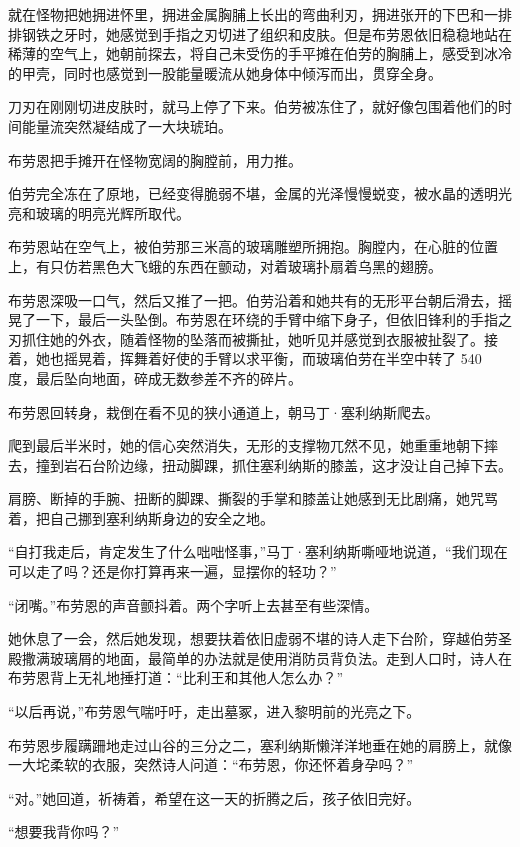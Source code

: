\documentclass[AutoFakeBold=true]{book}
\begin{document}
就在怪物把她拥进怀里，拥进金属胸脯上长出的弯曲利刃，拥进张开的下巴和一排排钢铁之牙时，她感觉到手指之刃切进了组织和皮肤。但是布劳恩依旧稳稳地站在稀薄的空气上，她朝前探去，将自己未受伤的手平摊在伯劳的胸脯上，感受到冰冷的甲壳，同时也感觉到一股能量暖流从她身体中倾泻而出，贯穿全身。

刀刃在刚刚切进皮肤时，就马上停了下来。伯劳被冻住了，就好像包围着他们的时间能量流突然凝结成了一大块琥珀。

布劳恩把手摊开在怪物宽阔的胸膛前，用力推。

伯劳完全冻在了原地，已经变得脆弱不堪，金属的光泽慢慢蜕变，被水晶的透明光亮和玻璃的明亮光辉所取代。

布劳恩站在空气上，被伯劳那三米高的玻璃雕塑所拥抱。胸膛内，在心脏的位置上，有只仿若黑色大飞蛾的东西在颤动，对着玻璃扑扇着乌黑的翅膀。

布劳恩深吸一口气，然后又推了一把。伯劳沿着和她共有的无形平台朝后滑去，摇晃了一下，最后一头坠倒。布劳恩在环绕的手臂中缩下身子，但依旧锋利的手指之刃抓住她的外衣，随着怪物的坠落而被撕扯，她听见并感觉到衣服被扯裂了。接着，她也摇晃着，挥舞着好使的手臂以求平衡，而玻璃伯劳在半空中转了 540 度，最后坠向地面，碎成无数参差不齐的碎片。

布劳恩回转身，栽倒在看不见的狭小通道上，朝马丁·塞利纳斯爬去。

爬到最后半米时，她的信心突然消失，无形的支撑物兀然不见，她重重地朝下摔去，撞到岩石台阶边缘，扭动脚踝，抓住塞利纳斯的膝盖，这才没让自己掉下去。

肩膀、断掉的手腕、扭断的脚踝、撕裂的手掌和膝盖让她感到无比剧痛，她咒骂着，把自己挪到塞利纳斯身边的安全之地。

``自打我走后，肯定发生了什么咄咄怪事，''马丁·塞利纳斯嘶哑地说道，``我们现在可以走了吗？还是你打算再来一遍，显摆你的轻功？''

``闭嘴。''布劳恩的声音颤抖着。两个字听上去甚至有些深情。

她休息了一会，然后她发现，想要扶着依旧虚弱不堪的诗人走下台阶，穿越伯劳圣殿撒满玻璃屑的地面，最简单的办法就是使用消防员背负法。走到人口时，诗人在布劳恩背上无礼地捶打道：``比利王和其他人怎么办？''

``以后再说，''布劳恩气喘吁吁，走出墓冢，进入黎明前的光亮之下。

布劳恩步履蹒跚地走过山谷的三分之二，塞利纳斯懒洋洋地垂在她的肩膀上，就像一大坨柔软的衣服，突然诗人问道：``布劳恩，你还怀着身孕吗？''

``对。''她回道，祈祷着，希望在这一天的折腾之后，孩子依旧完好。

``想要我背你吗？''
\end{document}
